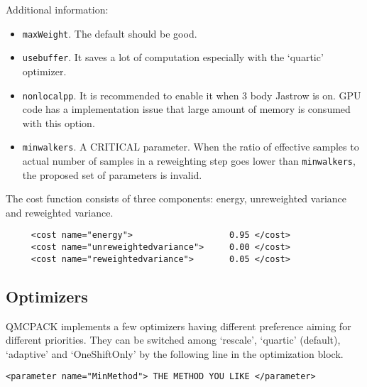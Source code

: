 Additional information:
\begin{itemize}
\item \texttt{maxWeight}. The default should be good.
\item \texttt{usebuffer}. It saves a lot of computation especially with the `quartic' optimizer.
\item \texttt{nonlocalpp}. It is recommended to enable it when 3 body Jastrow is on. GPU code has a implementation issue that large amount of memory is consumed with this option.
\item \texttt{minwalkers}. A CRITICAL parameter. When the ratio of effective samples to actual number of samples in a reweighting step goes lower than \texttt{minwalkers},
the proposed set of parameters is invalid. %
\end{itemize}

The cost function consists of three components: energy, unreweighted variance and reweighted variance.
\begin{lstlisting}
     <cost name="energy">                   0.95 </cost>
     <cost name="unreweightedvariance">     0.00 </cost>
     <cost name="reweightedvariance">       0.05 </cost>
\end{lstlisting}

\subsection{Optimizers}
QMCPACK implements a few optimizers having different preference aiming for different priorities.
They can be switched among `rescale', `quartic' (default), `adaptive' and `OneShiftOnly' by the following line in the optimization block.
\begin{lstlisting}
<parameter name="MinMethod"> THE METHOD YOU LIKE </parameter>
\end{lstlisting}

